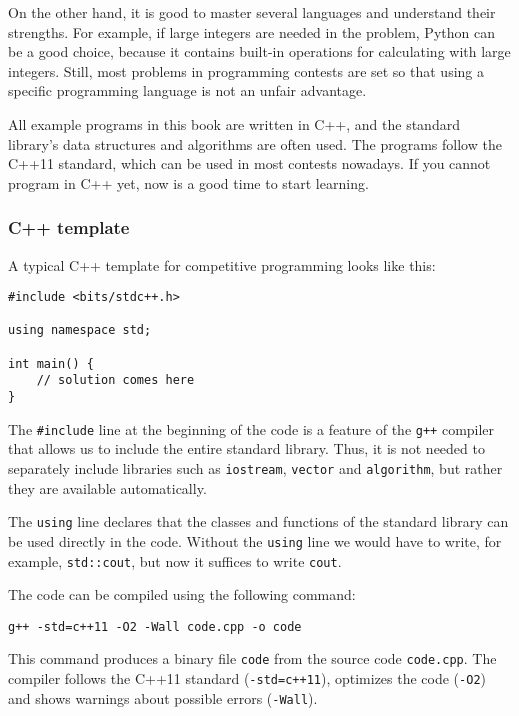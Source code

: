 On the other hand, it is good to
master several languages and understand
their strengths.
For example, if large integers are needed
in the problem,
Python can be a good choice, because it
contains built-in operations for
calculating with large integers.
Still, most problems in programming contests
are set so that
using a specific programming language
is not an unfair advantage.

All example programs in this book are written in C++,
and the standard library's
data structures and algorithms are often used.
The programs follow the C++11 standard,
which can be used in most contests nowadays.
If you cannot program in C++ yet,
now is a good time to start learning.

\subsubsection{C++ template}

A typical C++ template for competitive programming
looks like this:

\begin{lstlisting}
#include <bits/stdc++.h>

using namespace std;

int main() {
    // solution comes here
}
\end{lstlisting}

The \texttt{\#include} line at the beginning
of the code is a feature of the \texttt{g++} compiler
that allows us to include the entire standard library.
Thus, it is not needed to separately include
libraries such as \texttt{iostream},
\texttt{vector} and \texttt{algorithm},
but rather they are available automatically.

The \texttt{using} line declares
that the classes and functions
of the standard library can be used directly
in the code.
Without the \texttt{using} line we would have
to write, for example, \texttt{std::cout},
but now it suffices to write \texttt{cout}.

The code can be compiled using the following command:

\begin{lstlisting}
g++ -std=c++11 -O2 -Wall code.cpp -o code
\end{lstlisting}

This command produces a binary file \texttt{code}
from the source code \texttt{code.cpp}.
The compiler follows the C++11 standard
(\texttt{-std=c++11}),
optimizes the code (\texttt{-O2})
and shows warnings about possible errors (\texttt{-Wall}).

